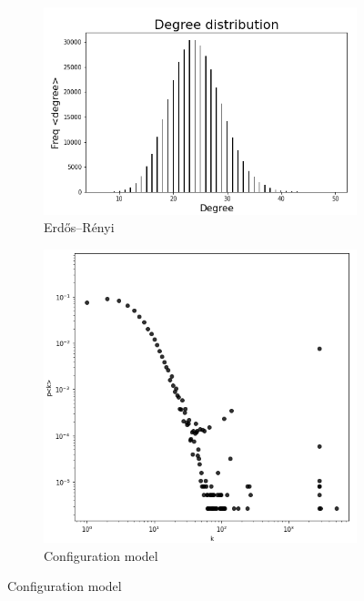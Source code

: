 \documentclass[sigchi]{acmart}
\begin{document}
\begin{figure}[]
\begin{subfigure}{.45\columnwidth}
  \centering
  \includegraphics[width=\columnwidth]{report/img/er_degr.png} 
  \caption{Erdős–Rényi}
  \label{fig:sub-er}
\end{subfigure}
\hfill
\begin{subfigure}{.45\columnwidth}
  \centering
  \includegraphics[width=\columnwidth]{report/img/degreeDistribution.png}
  \caption{Configuration model}
  \label{fig:sub-conf}
\end{subfigure}

\end{figure}
\end{document}
